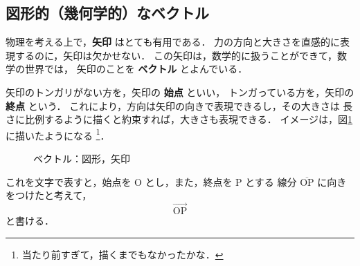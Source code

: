             \subsection{図形的（幾何学的）なベクトル}
                物理を考える上で，\textbf{矢印} はとても有用である．
                力の方向と大きさを直感的に表現するのに，矢印は欠かせない．
                この矢印は，数学的に扱うことができて，数学の世界では，
                矢印のことを \textbf{ベクトル} とよんでいる．

                矢印のトンガリがない方を，矢印の \textbf{始点} といい，
                トンガっている方を，矢印の \textbf{終点} という．
                これにより，方向は矢印の向きで表現できるし，その大きさは
                長さに比例するように描くと約束すれば，大きさも表現できる．
                イメージは，図\ref{fig:yajirusi_vector}に描いたようになる
                    \footnote{
                        当たり前すぎて，描くまでもなかったかな．
                    }．
                        \begin{figure}[hbt]
                            \begin{center}
                                \caption{ベクトル：図形，矢印}
                                \label{fig:yajirusi_vector}
                            \end{center}
                        \end{figure}

                これを文字で表すと，始点を $\mathrm{O}$ とし，また，終点を $\mathrm{P}$ とする
                線分 $\overline{\mathrm{OP}}$ に向きをつけたと考えて，
                    \begin{equation*}
                        \overrightarrow{\mathrm{OP}}
                    \end{equation*}
                と書ける．

